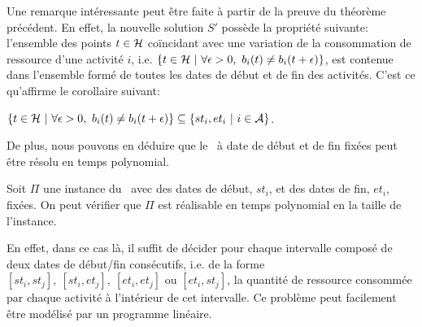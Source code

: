 Une remarque intéressante peut être faite à partir de la preuve du
théorème précédent. En effet, la nouvelle solution $S'$ possède la
propriété suivante: l'ensemble des points $t \in {\cal H}$ coïncidant avec
une variation de la consommation de ressource d'une activité $i$,
i.e. $\{t \in \H \ |\ \forall \epsilon>0,\ b_i(t) \neq b_i(t+\epsilon)\}$,
est contenue dans l'ensemble formé de toutes les dates de début et de
fin des activités. C'est ce qu'affirme le corollaire suivant: 

\begin{coro}
$\{t \in \H \ |\ \forall \epsilon>0,\ b_i(t) \neq b_i(t+\epsilon)\}
\subseteq \{st_i,et_i\ |\ i \in \A \}$.
\end{coro}

De plus, nous pouvons en déduire que le \CECSP~à date de début et de
fin fixées peut être résolu en temps polynomial. 

\begin{prop}
Soit $\Pi$ une instance du \CECSP~avec des dates de début, $st_i$, et
des dates de fin, $et_i$, fixées. On peut vérifier que $\Pi$ est réalisable en temps 
polynomial en la taille de l'instance. 
\end{prop}

En effet, dans ce cas là, il suffit de décider pour chaque intervalle
composé de deux dates de début/fin consécutifs, i.e. de la forme
$[st_i,st_j],\ [st_i,et_j],\ [et_i,et_j]$ ou $[et_i,st_j]$, la
quantité de ressource consommée par chaque activité à l'intérieur de
cet intervalle. Ce problème peut facilement être modélisé par un
programme linéaire.

